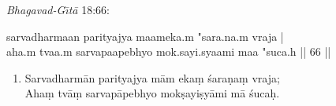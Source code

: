 \documentclass[12pt]{article}
\begin{document}
\textit{Bhagavad-G\={\i}t\={a}} 18:66:

{\skt sarvadharmaan parityajya maameka.m "sara.na.m vraja | \\
  aha.m tvaa.m sarvapaapebhyo mok.sayi.syaami maa "suca.h || 66 ||}

\begin{enumerate}\itshape

  \setcounter{enumi}{65}

  \item
  Sarvadharm\={a}n parityajya m\={a}m eka\d{m} \'{s}ara\d{n}a\d{m} vraja; \\
  Aha\d{m} tv\={a}\d{m} sarvap\={a}pebhyo mok\d{s}ayi\d{s}y\={a}mi m\={a}     
  \'{s}uca\d{h}.

\end{enumerate}
\end{document}
